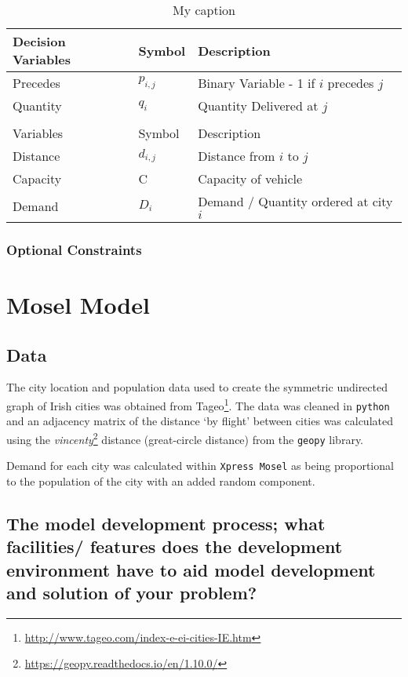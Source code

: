 \documentclass[a4paper,11pt]{article}
\begin{document}
\begin{table}[h!]
\centering
\caption{My caption}
\label{variables}
\begin{tabular}{lll}
\hline
Decision Variables & Symbol & Description \\
\hline
\hline
Precedes & $p_{i,j}$  & Binary Variable - 1 if $i$ precedes $j$\\
Quantity & $q_{i}$ & Quantity Delivered at $j$ \\
\\
\hline
Variables & Symbol & Description \\
\hline
\hline
Distance & $d_{i,j}$ & Distance from $i$ to $j$  \\
Capacity & C & Capacity of vehicle \\ 
Demand & $D_{i}$ & Demand / Quantity ordered at city $i$ \\  
\end{tabular}
\end{table}

\subsubsection{Optional Constraints}

\section{Mosel Model}

\subsection{Data}

The city location and population data used to create the symmetric undirected graph of Irish cities was obtained from Tageo\footnote{\url{http://www.tageo.com/index-e-ei-cities-IE.htm}}. The data was cleaned in \texttt{python} and an adjacency matrix of the distance `by flight' between cities was calculated using the \textit{vincenty}\footnote{\url{https://geopy.readthedocs.io/en/1.10.0/}} distance (great-circle distance) from the \texttt{geopy} library.

Demand for each city was calculated within \texttt{Xpress Mosel} as being proportional to the population of the city with an added random component.

\subsection{The model development process; what facilities/ features does the development environment
have to aid model development and solution of your problem? }
\end{document}
